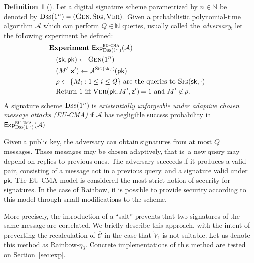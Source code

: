 \documentclass[12pt, a4paper, oneside]{memoir}
\theoremstyle{definition}
\newtheorem{definition}[theorem]{Definition}
\begin{document}
\begin{definition}[{\cite[Def.~1.2]{Chen:201612}}]
  Let a digital signature scheme parametrized by $n \in \mathbb{N}$ be denoted by $\textsc{Dss}(1^{n}) = (\textsc{Gen}, \textsc{Sig}, \textsc{Ver})$. Given a probabilistic polynomial-time algorithm $\mathcal{A}$ which can perform $Q \in \mathbb{N}$ queries, usually called the \emph{adversary}, let the following experiment be defined:
  \begin{align}
    \begin{split}
      &\textbf{Experiment } \mathsf{Exp}_{\textsc{Dss}(1^{n})}^{\textsc{eu-cma}}(\mathcal{A}) \\
      &\quad (\mathsf{sk}, \mathsf{pk}) \gets \textsc{Gen}(1^{n}) \\
      &\quad (M', \mathbf{z'}) \gets \mathcal{A}^{\textsc{Sig}(\mathsf{sk}, \cdot)}(\mathsf{pk}) \\
      &\quad \rho \gets \{ M_{i} : 1 \leq i \leq Q \} \text{ are the queries to } \textsc{Sig}(\mathsf{sk}, \cdot) \\
      &\quad \text{Return 1 iff } \textsc{Ver}(\mathsf{pk}, M', \mathsf{z'}) = 1 \text{ and } M' \not\in \rho.
    \end{split}
  \end{align}
  A signature scheme $\textsc{Dss}(1^{n})$ is \emph{existentially unforgeable under adaptive chosen message attacks (\textsf{EU-CMA})} if $\mathcal{A}$ has negligible success probability in $\mathsf{Exp}_{\textsc{Dss}(1^{n})}^{\textsc{eu-cma}}(\mathcal{A})$.
\end{definition}

Given a public key, the adversary can obtain signatures from at most $Q$ messages. These messages may be chosen adaptively, that is, a new query may depend on replies to previous ones. The adversary succeeds if it produces a valid pair, consisting of a message not in a previous query, and a signature valid under $\mathsf{pk}$. The \textsf{EU-CMA} model is considered the most strict notion of security for signatures. In the case of Rainbow, it is possible to provide security according to this model through small modifications to the scheme.

More precisely, the introduction of a ``salt'' prevents that two signatures of the same message are correlated. We briefly describe this approach, with the intent of preventing the recalculation of $\overline{\mathcal{C}}$ in the case that $\widetilde{V}_{1}$ is not suitable. Let us denote this method as Rainbow-$\eta_{3}$. Concrete implementations of this method are tested on Section~\ref{sec:exp}.
\end{document}
